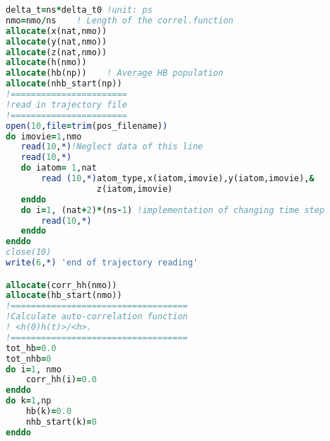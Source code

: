 \begin{lstlisting}[language=fortran]
delta_t=ns*delta_t0 !unit: ps
nmo=nmo/ns    ! Length of the correl.function
allocate(x(nat,nmo))
allocate(y(nat,nmo))
allocate(z(nat,nmo))
allocate(h(nmo))
allocate(hb(np))    ! Average HB population
allocate(nhb_start(np))
!=======================
!read in trajectory file
!=======================
open(10,file=trim(pos_filename))
do imovie=1,nmo
   read(10,*)!Neglect data of this line
   read(10,*)
   do iatom= 1,nat
       read (10,*)atom_type,x(iatom,imovie),y(iatom,imovie),&
                  z(iatom,imovie)
   enddo
   do i=1, (nat+2)*(ns-1) !implementation of changing time step
       read(10,*)
   enddo
enddo
close(10)
write(6,*) 'end of trajectory reading'

allocate(corr_hh(nmo))
allocate(hb_start(nmo))
!===================================
!Calculate auto-correlation function
! <h(0)h(t)>/<h>.
!===================================
tot_hb=0.0
tot_nhb=0
do i=1, nmo
    corr_hh(i)=0.0
enddo
do k=1,np
    hb(k)=0.0
    nhb_start(k)=0
enddo


\end{lstlisting}
